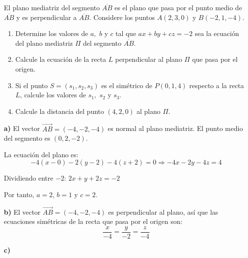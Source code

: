\begin{prob} El plano mediatriz del segmento $\overline{AB}$ es el plano que pasa por el punto medio de $\overline{AB}$ y es perpendicular a $\overline{AB}$. Considere los puntos $A(2,3,0)$ y $B(-2,1,-4)$.

 \begin{enumerate}[$a)$]
 \item Determine los valores de $a,$ $b$ y $c$ tal que $ax+by+cz=-2$ sea la ecuación del plano mediatriz $\Pi$ del segmento $\overline{AB}$.

\item Calcule la ecuación de la recta $L$ perpendicular al plano $\Pi$ que pasa por el origen.
 
\item Si el punto $S=(s_1,s_2,s_3)$ es el simétrico de $P(0,1,4)$ respecto a la recta $L$, calcule los valores de $s_1,$ $s_2$ y $s_3$.
  
\item Calcule la distancia del punto $(4,2,0)$ al plano $\Pi$.
 \end{enumerate}
 
\begin{myproof}

\textbf{a)} El vector $\overrightarrow{AB}=(-4,-2,-4)$ es normal al plano mediatriz. El punto medio del segmento es $(0,2,-2)$.

La ecuación del plano es:
$$-4(x-0)-2(y-2)-4(z+2)=0 \Rightarrow -4x-2y-4z=4$$

Dividiendo entre $-2$: $2x+y+2z=-2$

Por tanto, $a=2$, $b=1$ y $c=2$.

\textbf{b)} El vector $\overrightarrow{AB}=(-4,-2,-4)$ es perpendicular al plano, así que las ecuaciones simétricas de la recta que pasa por el origen son:
\begin{equation}
\frac{x}{-4}=\frac{y}{-2}=\frac{z}{-4}
\end{equation}

\textbf{c)} 

\begin{figure}[H]
\centering
{}
\end{figure}
\end{myproof}
\end{prob}
